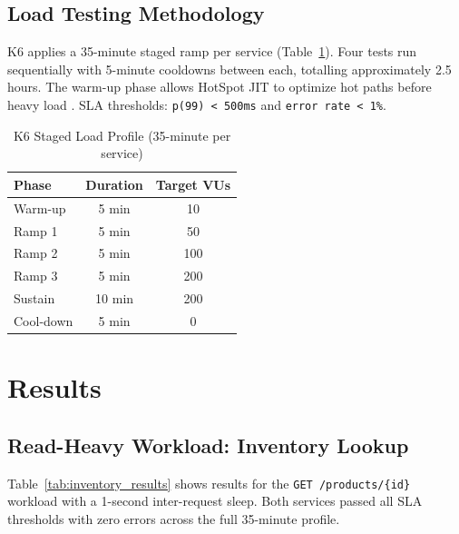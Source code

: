\documentclass[conference]{IEEEtran}
\begin{document}
\subsection{Load Testing Methodology}

K6 applies a 35-minute staged ramp per service (Table~\ref{tab:loadprofile}). Four tests run sequentially with 5-minute cooldowns between each, totalling approximately 2.5 hours. The warm-up phase allows HotSpot JIT to optimize hot paths before heavy load \cite{b8}. SLA thresholds: \texttt{p(99) < 500ms} and \texttt{error rate < 1\%}.

\begin{table}[htbp]
\caption{K6 Staged Load Profile (35-minute per service)}
\begin{center}
\begin{tabular}{|l|c|c|}
\hline
\textbf{Phase} & \textbf{Duration} & \textbf{Target VUs} \\
\hline
Warm-up    & 5 min  & 10  \\
Ramp 1     & 5 min  & 50  \\
Ramp 2     & 5 min  & 100 \\
Ramp 3     & 5 min  & 200 \\
Sustain    & 10 min & 200 \\
Cool-down  & 5 min  & 0   \\
\hline
\end{tabular}
\label{tab:loadprofile}
\end{center}
\end{table}

\section{Results}

\subsection{Read-Heavy Workload: Inventory Lookup}

Table~\ref{tab:inventory_results} shows results for the \texttt{GET /products/\{id\}} workload with a 1-second inter-request sleep. Both services passed all SLA thresholds with zero errors across the full 35-minute profile.
\end{document}
